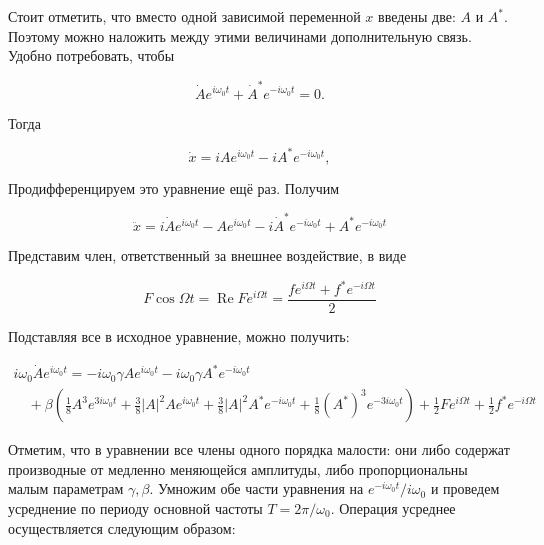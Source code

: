 \documentclass[11pt]{article}
\begin{document}
Стоит отметить, что вместо одной зависимой переменной \(x\) введены две:
\(A\) и \(A^{*}\). Поэтому можно наложить между этими величинами
дополнительную связь. Удобно потребовать, чтобы

\begin{equation}
    \dot{A} e^{i \omega_0 t} + \dot{A}^{*} e^{-i \omega_0 t} = 0.
\end{equation}

Тогда

\begin{equation}
\dot{x}=i A e^{i \omega_0 t}-i A^{*} e^{-i \omega_0 t},
\end{equation}

Продифференцируем это уравнение ещё раз. Получим

\begin{equation}
\ddot{x}=i \dot{A} e^{i \omega_0 t}-A e^{i \omega_0 t}-i \dot{A}^{*} e^{-i \omega_0 t}+A^{*} e^{-i \omega_0 t}
\end{equation}

Представим член, ответственный за внешнее воздействие, в виде

\begin{equation}
F \cos \Omega t=\operatorname{Re} F e^{i \Omega t}=\dfrac{f e^{i \Omega t}+f^{*} e^{-i \Omega t}}{2}
\end{equation}

Подставляя все в исходное уравнение, можно получить:

\begin{equation}
\begin{array}{l}
i \omega_{0} \dot{A} e^{i \omega_{0} t}=-i \omega_{0} \gamma A e^{i \omega_{0} t}-i \omega_{0} \gamma A^{*} e^{-i \omega_{0} t} \\
\quad+\beta\left(\frac{1}{8} A^{3} e^{3 i \omega_{0} t}+\frac{3}{8}|A|^{2} A e^{i \omega_{0} t}+\frac{3}{8}|A|^{2} A^{*} e^{-i \omega_{0} t}+\frac{1}{8}\left(A^{*}\right)^{3} e^{-3 i \omega_{0} t}\right)+\frac{1}{2} F e^{i \Omega t}+\frac{1}{2} f^{*} e^{-i \Omega t}
\end{array}
\end{equation}

Отметим, что в уравнении все члены одного порядка малости: они либо
содержат производные от медленно меняющейся амплитуды, либо
пропорциональны малым параметрам \(\gamma, \beta\). Умножим обе части
уравнения на \(e^{- i \omega_0 t} / i \omega_0\) и проведем усреднение
по периоду основной частоты \(T = 2 \pi / \omega_0\). Операция усреднее
осуществляется следующим образом:
\end{document}
